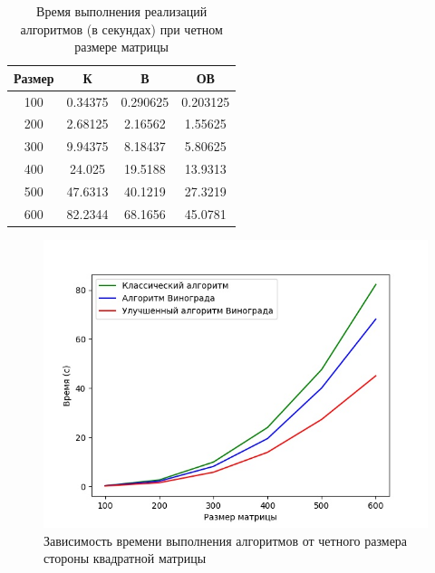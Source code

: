 \begin{table}[ht]
    \caption{\centering Время выполнения реализаций алгоритмов (в секундах) при четном размере матрицы}
    \centering
    \begin{tabular}{|c|c|c|c|}
    \hline
    Размер & К      & В      & ОВ     \\ \hline
    100    & 0.34375 & 0.290625 & 0.203125 \\ \hline
    200    & 2.68125  & 2.16562  & 1.55625  \\ \hline
    300    & 9.94375  & 8.18437 & 5.80625 \\ \hline
    400    & 24.025  & 19.5188 & 13.9313 \\ \hline
    500    & 47.6313  & 40.1219 & 27.3219 \\ \hline
    600    & 82.2344 & 68.1656 & 45.0781 \\ \hline
    \end{tabular}
    \label{tab:time_best}
\end{table}

\begin{figure}
    \centering
    \includegraphics[scale=0.65]{chet_matr.jpeg}
    \caption{Зависимость времени выполнения алгоритмов от четного размера стороны квадратной матрицы}
    \label{img:plot_best}
\end{figure}


